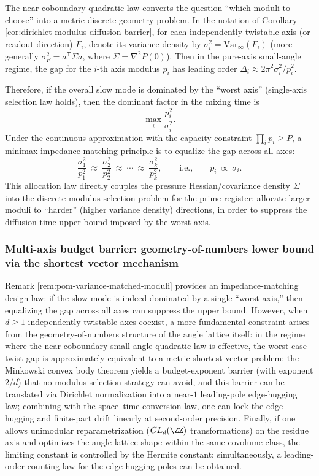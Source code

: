 \begin{remark}\label{rem:pom-variance-matched-moduli}
The near-coboundary quadratic law converts the question ``which moduli to choose'' into a metric discrete geometry problem.
In the notation of Corollary \ref{cor:dirichlet-modulus-diffusion-barrier}, for each independently twistable axis (or readout direction) \(F_i\), denote its variance density by \(\sigma_i^2=\mathrm{Var}_\infty(F_i)\) (more generally \(\sigma_F^2=a^{\mathsf T}\Sigma a\), where \(\Sigma=\nabla^2P(0)\)).
Then in the pure-axis small-angle regime, the gap for the \(i\)-th axis modulus \(p_i\) has leading order \(\Delta_i\approx 2\pi^2\sigma_i^2/p_i^2\).
\par
Therefore, if the overall slow mode is dominated by the ``worst axis'' (single-axis selection law holds), then the dominant factor in the mixing time is
\[
\max_i\frac{p_i^2}{\sigma_i^2}.
\]
Under the continuous approximation with the capacity constraint \(\prod_i p_i\ge P\), a minimax impedance matching principle is to equalize the gap across all axes:
\[
\frac{\sigma_1^2}{p_1^2}\ \approx\ \frac{\sigma_2^2}{p_2^2}\ \approx\ \cdots\ \approx\ \frac{\sigma_k^2}{p_k^2},
\qquad\text{i.e.,}\qquad
p_i\ \propto\ \sigma_i.
\]
This allocation law directly couples the pressure Hessian/covariance density \(\Sigma\) into the discrete modulus-selection problem for the prime-register: allocate larger moduli to ``harder'' (higher variance density) directions, in order to suppress the diffusion-time upper bound imposed by the worst axis.
\end{remark}

\subsubsection{Multi-axis budget barrier: geometry-of-numbers lower bound via the shortest vector mechanism}\label{subsubsec:pom-multi-axis-budget-barrier}
Remark \ref{rem:pom-variance-matched-moduli} provides an impedance-matching design law: if the slow mode is indeed dominated by a single ``worst axis,'' then equalizing the gap across all axes can suppress the upper bound.
However, when \(d\ge 1\) independently twistable axes coexist, a more fundamental constraint arises from the geometry-of-numbers structure of the angle lattice itself: in the regime where the near-coboundary small-angle quadratic law is effective, the worst-case twist gap is approximately equivalent to a metric shortest vector problem;
the Minkowski convex body theorem yields a budget-exponent barrier (with exponent \(2/d\)) that no modulus-selection strategy can avoid, and this barrier can be translated via Dirichlet normalization into a near-\(1\) leading-pole edge-hugging law; combining with the space--time conversion law, one can lock the edge-hugging and finite-part drift linearly at second-order precision.
Finally, if one allows unimodular reparametrization (\(GL_d(\ZZ)\) transformations) on the residue axis and optimizes the angle lattice shape within the same covolume class, the limiting constant is controlled by the Hermite constant; simultaneously, a leading-order counting law for the edge-hugging poles can be obtained.

